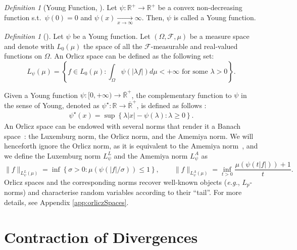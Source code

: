 \documentclass[11pt]{article}
\theoremstyle{plain}
\theoremstyle{remark}
\newtheorem{definition}[theorem]{Definition}
\begin{document}
\begin{definition}[Young Function, {\cite[Chapter 3]{theoryOrliczSpaces}}]
    Let $\psi:\mathbb{R}^+\to\mathbb{R}^+$ be a convex non-decreasing function s.t.\ $\psi(0)=0$ and $\psi(x)\xrightarrow[x\to\infty]{} \infty$. Then, $\psi$ is called a Young function.
\end{definition}
\begin{definition}[{\cite[Definition 5]{theoryOrliczSpaces}}]
    Let $\psi$ be a Young function. Let $(\Omega,\mathcal{F}, \mu)$ be a measure space and denote with $L_0(\mu)$ the space of all the $\mathcal{F}$-measurable and real-valued functions on $\Omega$. An Orlicz space can be defined as the following set:
    \begin{equation}
        L_\psi(\mu) = \left\{f\in L_0(\mu) : \int_\Omega \psi(|\lambda f|)d\mu < +\infty\text{ for some }\lambda>0\right\}. \label{eq:orliczSpace}
    \end{equation}
\end{definition}
    Given a Young function $\psi: [0,+\infty) \to \overline{\mathbb{R}}^+$, the complementary function to $\psi$ in the sense of Young, denoted as  $\psi^\star: \mathbb{R} \to  \overline{\mathbb{R}}^+ $, is defined as follows \cite[Section 1.3]{theoryOrliczSpaces}: %
    \begin{align} \label{eq:youngComplement}
        \psi^\star(x) = \sup\left\{\lambda|x| - \psi(\lambda) : \lambda\geq 0 \right\}.
    \end{align}
An Orlicz space can be endowed with several norms that render it a Banach space~\cite{orliczAmemiyaNorm}: the Luxemburg norm, the Orlicz norm, and the Amemiya norm. We will henceforth ignore the Orlicz norm, as it %
is equivalent to the Amemiya norm~\cite{orliczAmemiyaNorm}, and we define the Luxemburg norm $L_\psi^L$ and the Amemiya norm $L_\psi^A$ as
\begin{equation}
    \lVert f\rVert_{L^L_\psi(\mu)} =\inf \left\{ \sigma > 0 : \mu\left(\psi\left(|f|/\sigma\right)\right)\leq 1\right\} ,\qquad
 \lVert f\rVert_{L^A_\psi(\mu)} = \inf_{t>0}  \frac{\mu\left(\psi(t|f|)\right)+1}{t}.\label{eq:amemiyaNorm}
\end{equation}
Orlicz spaces and the corresponding 
norms 
recover well-known objects (\emph{e.g.}, $L_p$-norms) and characterise random variables according to their ``tail''. For more details, see Appendix \ref{app:orliczSpaces}. %



    \section{Contraction of Divergences}\label{sec:contractionDivergences}
 
\end{document}
